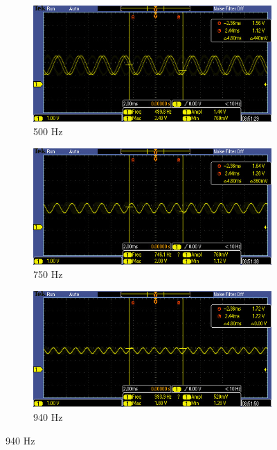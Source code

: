 \documentclass[12pt]{article}
\begin{document}
\begin{figure}[H]
\begin{subfigure}[b]{0.45\textwidth}
  \end{subfigure}
  \begin{subfigure}[b]{0.45\textwidth}
    \includegraphics[width=\textwidth]{./img/TEK00005}
    \caption{500 Hz}
    \label{fig:dig_500}
  \end{subfigure}
  \begin{subfigure}[b]{0.45\textwidth}
    \includegraphics[width=\textwidth]{./img/TEK00006}
    \caption{750 Hz}
    \label{fig:dig_750}
  \end{subfigure}
  \begin{subfigure}[b]{0.45\textwidth}
    \includegraphics[width=\textwidth]{./img/TEK00007}
    \caption{940 Hz}
    \label{fig:dig_940}

\end{subfigure}
\end{figure}
\end{document}
